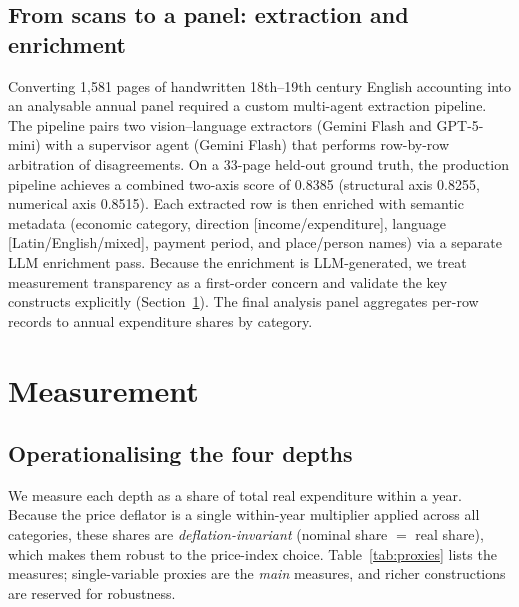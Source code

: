 \documentclass[11pt]{article}
\begin{document}
\subsection{From scans to a panel: extraction and enrichment}

Converting 1{,}581 pages of handwritten 18th--19th century English accounting into an analysable
annual panel required a custom multi-agent extraction pipeline. The pipeline pairs two
vision--language extractors (Gemini Flash and GPT-5-mini) with a supervisor agent (Gemini Flash)
that performs row-by-row arbitration of disagreements. On a 33-page held-out ground truth, the
production pipeline achieves a combined two-axis score of 0.8385 (structural axis 0.8255,
numerical axis 0.8515). Each extracted row is then enriched with semantic metadata (economic
category, direction [income/expenditure], language [Latin/English/mixed], payment period, and
place/person names) via a separate LLM enrichment pass. Because the enrichment is
LLM-generated, we treat measurement transparency as a first-order concern and validate the key
constructs explicitly (Section~\ref{sec:measurement}). The final analysis panel aggregates
per-row records to annual expenditure shares by category.

\section{Measurement}
\label{sec:measurement}

\subsection{Operationalising the four depths}

We measure each depth as a share of total real expenditure within a year. Because the price
deflator is a single within-year multiplier applied across all categories, these shares are
\emph{deflation-invariant} (nominal share $=$ real share), which makes them robust to the
price-index choice. Table~\ref{tab:proxies} lists the measures; single-variable proxies are the
\emph{main} measures, and richer constructions are reserved for robustness.
\end{document}

